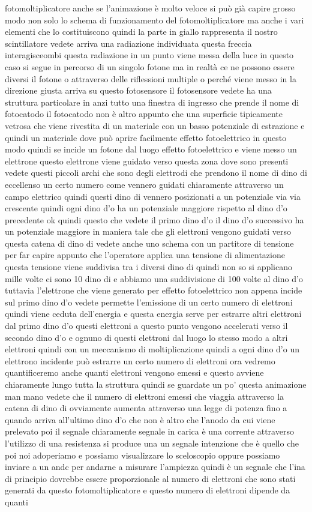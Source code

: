 {fotomoltiplicatore anche se l'animazione è molto veloce si può già capire grosso modo non solo lo schema di funzionamento del fotomoltiplicatore ma anche i vari elementi che lo costituiscono quindi la parte in giallo rappresenta il nostro scintillatore vedete arriva una radiazione individuata questa freccia interagisceombi questa radiazione in un punto viene messa della luce in questo caso si segue in percorso di un singolo fotone ma in realtà ce ne possono essere diversi il fotone o attraverso delle riflessioni multiple o perché viene messo in la direzione giusta arriva su questo fotosensore il fotosensore vedete ha una struttura particolare in anzi tutto una finestra di ingresso che prende il nome di fotocatodo il fotocatodo non è altro appunto che una superficie tipicamente vetrosa che viene rivestita di un materiale con un basso potenziale di estrazione e quindi un materiale dove può aprire facilmente effetto fotoelettrico in questo modo quindi se incide un fotone dal luogo effetto fotoelettrico e viene messo un elettrone questo elettrone viene guidato verso questa zona dove sono presenti vedete questi piccoli archi che sono degli elettrodi che prendono il nome di dino di eccellenso un certo numero come vennero guidati chiaramente attraverso un campo elettrico quindi questi dino di vennero posizionati a un potenziale via via crescente quindi ogni dino d'o ha un potenziale maggiore rispetto al dino d'o precedente ok quindi questo che vedete il primo dino d'o il dino d'o successivo ha un potenziale maggiore in maniera tale che gli elettroni vengono guidati verso questa catena di dino di vedete anche uno schema con un partitore di tensione per far capire appunto che l'operatore applica una tensione di alimentazione questa tensione viene suddivisa tra i diversi dino di quindi non so si applicano mille volte ci sono 10 dino di e abbiamo una suddivisione di 100 volte al dino d'o tuttavia l'elettrone che viene generato per effetto fotoelettrico non appena incide sul primo dino d'o vedete permette l'emissione di un certo numero di elettroni quindi viene ceduta dell'energia e questa energia serve per estrarre altri elettroni dal primo dino d'o questi elettroni a questo punto vengono accelerati verso il secondo dino d'o e ognuno di questi elettroni dal luogo lo stesso modo a altri elettroni quindi con un meccanismo di moltiplicazione quindi a ogni dino d'o un elettrono incidente può estrarre un certo numero di elettroni ora vedremo quantificeremo anche quanti elettroni vengono emessi e questo avviene chiaramente lungo tutta la struttura quindi se guardate un po' questa animazione man mano vedete che il numero di elettroni emessi che viaggia attraverso la catena di dino di ovviamente aumenta attraverso una legge di potenza fino a quando arriva all'ultimo dino d'o che non è altro che l'anodo da cui viene prelevato poi il segnale chiaramente segnale in carica è una corrente attraverso l'utilizzo di una resistenza si produce una un segnale intenzione che è quello che poi noi adoperiamo e possiamo visualizzare lo sceloscopio oppure possiamo inviare a un andc per andarne a misurare l'ampiezza quindi è un segnale che l'ina di principio dovrebbe essere proporzionale al numero di elettroni che sono stati generati da questo fotomoltiplicatore e questo numero di elettroni dipende da quanti }
